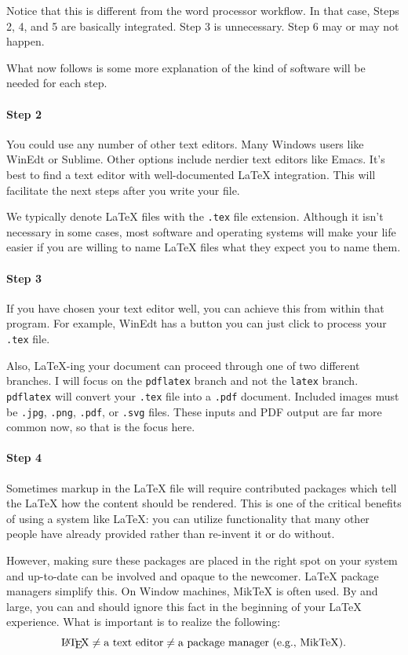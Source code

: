 Notice that this is different from the word processor workflow. In
that case, Steps 2, 4, and 5 are basically integrated. Step 3 is
unnecessary. Step 6 may or may not happen.

What now follows is some more explanation of the kind of software will be needed
for each step.

\paragraph{Step 2} You could use any number of other text editors. Many Windows
users like WinEdt or Sublime. Other options include nerdier text editors like
Emacs. It's best to find a text editor with well-documented \LaTeX{}
integration. This will facilitate the next steps after you write your file.

We typically denote \LaTeX{} files with the \texttt{.tex} file
extension. Although it isn't necessary in some cases, most software and
operating systems will make your life easier if you are willing to name \LaTeX{}
files what they expect you to name them.

\paragraph{Step 3} If you have chosen your text editor well, you can achieve
this from within that program. For example, WinEdt has a button you can just
click to process your \texttt{.tex} file.

\par Also, \LaTeX{}-ing your document can proceed through one of two different
branches. I will focus on the \texttt{pdflatex} branch and not the
\texttt{latex} branch. \texttt{pdflatex} will convert your \texttt{.tex} file
into a \texttt{.pdf} document. Included images must be \texttt{.jpg},
\texttt{.png}, \texttt{.pdf}, or \texttt{.svg} files. These inputs and PDF
output are far more common now, so that is the focus here.

\paragraph{Step 4} Sometimes markup in the \LaTeX{} file will require
contributed packages which tell the \LaTeX{} how the content should be
rendered. This is one of the critical benefits of using a system like \LaTeX{}:
you can utilize functionality that many other people have already provided
rather than re-invent it or do without.

However, making sure these packages are placed in the right spot on your system
and up-to-date can be involved and opaque to the newcomer. \LaTeX{} package
managers simplify this. On Window machines, MikTeX is often used. By and large,
you can and should ignore this fact in the beginning of your \LaTeX{}
experience. What is important is to realize the following:
\[
\textrm{\LaTeX{}} \neq \textrm{a text editor} \neq \textrm{a package manager
  (e.g., MikTeX)}.
\]

